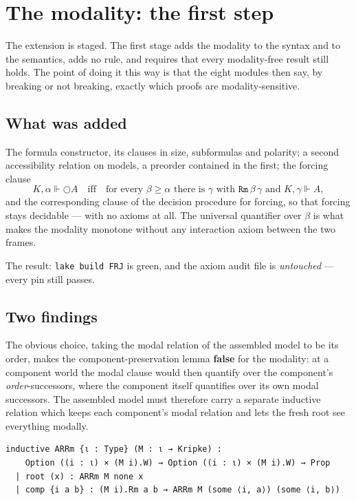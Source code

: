 \documentclass[11pt,a4paper]{article}
\begin{document}
\section{The modality: the first step}
\label{sec:w1}

The extension is staged. The first stage adds the modality to the syntax
and to the semantics, adds no rule, and requires that every
modality-free result still holds. The point of doing it this way is that
the eight modules then say, by breaking or not breaking, exactly which
proofs are modality-sensitive.

\subsection{What was added}

The formula constructor, its clauses in size, subformulas and polarity;
a second accessibility relation on models, a preorder contained in the
first; the forcing clause
\[
K,\alpha \Vdash \bigcirc A \quad\text{iff}\quad
\text{for every } \beta \geq \alpha \text{ there is } \gamma
\text{ with } \texttt{Rm}\,\beta\,\gamma \text{ and } K,\gamma \Vdash A,
\]
and the corresponding clause of the decision procedure for forcing, so
that forcing stays decidable --- with no axioms at all. The universal
quantifier over $\beta$ is what makes the modality monotone without any
interaction axiom between the two frames.

The result: \texttt{lake build FRJ} is green, and the axiom audit file is
\emph{untouched} --- every pin still passes.

\subsection{Two findings}

\begin{finding}
\label{find:arrm}
The obvious choice, taking the modal relation of the assembled model to be
its order, makes the component-preservation lemma \textbf{false} for the
modality: at a component world the modal clause would then quantify over
the component's \emph{order}-successors, where the component itself
quantifies over its own modal successors. The assembled model must
therefore carry a separate inductive relation which keeps each component's
modal relation and lets the fresh root see everything modally.
\end{finding}

\begin{lstlisting}
inductive ARRm {ι : Type} (M : ι → Kripke) :
    Option ((i : ι) × (M i).W) → Option ((i : ι) × (M i).W) → Prop
  | root (x) : ARRm M none x
  | comp {i a b} : (M i).Rm a b → ARRm M (some ⟨i, a⟩) (some ⟨i, b⟩)
\end{lstlisting}
\end{document}
